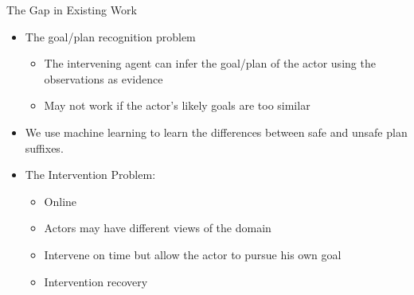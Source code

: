 \begin{frame}{The Gap in Existing Work}
\begin{itemize}
\item The goal/plan recognition problem 
\begin{itemize}
\item The intervening agent can infer the goal/plan of the actor using the observations as evidence
\item May not work if the actor's likely goals are too similar
\end{itemize}
\item We use machine learning to learn the differences between safe and unsafe plan suffixes.

\item The Intervention Problem:
\begin{itemize}
\item Online
\item Actors may have different views of the domain
\item Intervene on time but allow the actor to pursue his own goal
\item Intervention recovery
\end{itemize}


\end{itemize}

\end{frame}
